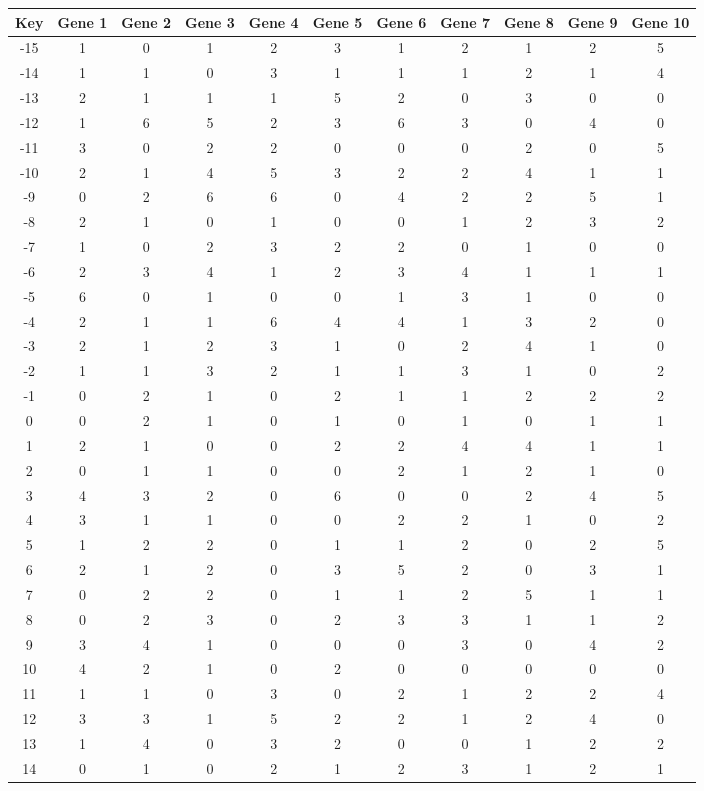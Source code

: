 \begin{tabular}{|c|c|c|c|c|c|c|c|c|c|c|}
\hline
Key & Gene 1 & Gene 2 & Gene 3 & Gene 4 & Gene 5 & Gene 6 & Gene 7 & Gene 8 & Gene 9 & Gene 10 \\
\hline
-15 & 1 & 0 & 1 & 2 & 3 & 1 & 2 & 1 & 2 & 5 \\
-14 & 1 & 1 & 0 & 3 & 1 & 1 & 1 & 2 & 1 & 4 \\
-13 & 2 & 1 & 1 & 1 & 5 & 2 & 0 & 3 & 0 & 0 \\
-12 & 1 & 6 & 5 & 2 & 3 & 6 & 3 & 0 & 4 & 0 \\
-11 & 3 & 0 & 2 & 2 & 0 & 0 & 0 & 2 & 0 & 5 \\
-10 & 2 & 1 & 4 & 5 & 3 & 2 & 2 & 4 & 1 & 1 \\
-9 & 0 & 2 & 6 & 6 & 0 & 4 & 2 & 2 & 5 & 1 \\
-8 & 2 & 1 & 0 & 1 & 0 & 0 & 1 & 2 & 3 & 2 \\
-7 & 1 & 0 & 2 & 3 & 2 & 2 & 0 & 1 & 0 & 0 \\
-6 & 2 & 3 & 4 & 1 & 2 & 3 & 4 & 1 & 1 & 1 \\
-5 & 6 & 0 & 1 & 0 & 0 & 1 & 3 & 1 & 0 & 0 \\
-4 & 2 & 1 & 1 & 6 & 4 & 4 & 1 & 3 & 2 & 0 \\
-3 & 2 & 1 & 2 & 3 & 1 & 0 & 2 & 4 & 1 & 0 \\
-2 & 1 & 1 & 3 & 2 & 1 & 1 & 3 & 1 & 0 & 2 \\
-1 & 0 & 2 & 1 & 0 & 2 & 1 & 1 & 2 & 2 & 2 \\
0 & 0 & 2 & 1 & 0 & 1 & 0 & 1 & 0 & 1 & 1 \\
1 & 2 & 1 & 0 & 0 & 2 & 2 & 4 & 4 & 1 & 1 \\
2 & 0 & 1 & 1 & 0 & 0 & 2 & 1 & 2 & 1 & 0 \\
3 & 4 & 3 & 2 & 0 & 6 & 0 & 0 & 2 & 4 & 5 \\
4 & 3 & 1 & 1 & 0 & 0 & 2 & 2 & 1 & 0 & 2 \\
5 & 1 & 2 & 2 & 0 & 1 & 1 & 2 & 0 & 2 & 5 \\
6 & 2 & 1 & 2 & 0 & 3 & 5 & 2 & 0 & 3 & 1 \\
7 & 0 & 2 & 2 & 0 & 1 & 1 & 2 & 5 & 1 & 1 \\
8 & 0 & 2 & 3 & 0 & 2 & 3 & 3 & 1 & 1 & 2 \\
9 & 3 & 4 & 1 & 0 & 0 & 0 & 3 & 0 & 4 & 2 \\
10 & 4 & 2 & 1 & 0 & 2 & 0 & 0 & 0 & 0 & 0 \\
11 & 1 & 1 & 0 & 3 & 0 & 2 & 1 & 2 & 2 & 4 \\
12 & 3 & 3 & 1 & 5 & 2 & 2 & 1 & 2 & 4 & 0 \\
13 & 1 & 4 & 0 & 3 & 2 & 0 & 0 & 1 & 2 & 2 \\
14 & 0 & 1 & 0 & 2 & 1 & 2 & 3 & 1 & 2 & 1 \\
\hline
\end{tabular}